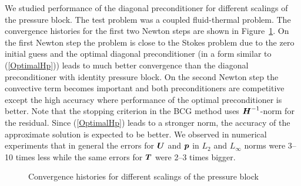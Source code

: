 We studied performance of the diagonal preconditioner for different
scalings of the pressure block. The test problem was a coupled
fluid-thermal problem.   The
convergence histories for the first two Newton steps are shown in
Figure~\ref{fig:precond}. On the first Newton step the problem is close to the Stokes
problem due to the zero initial guess and the optimal diagonal
preconditioner  (in a form similar to (\ref{OptimalHp})) leads to much better convergence than the diagonal
preconditioner with identity pressure block. On the second Newton step the
convective term becomes important and both preconditioners are
competitive except the high accuracy where performance of the optimal
preconditioner is better. Note that the stopping criterion in the BCG
method uses $\mbox{\boldmath $H$}^{-1}$-norm for the residual. Since (\ref{OptimalHp})
leads to a stronger norm, the accuracy of the approximate solution is
expected to be better. We observed in numerical experiments that  
in general the errors for $\mbox{\boldmath $U$}$ and $\mbox{\boldmath $p$}$ in $L_2$ and
$L_\infty$ norms were 3--10 times less while the same errors
for $\mbox{\boldmath $T$}$ were 2--3 times bigger.

%
\begin{figure}[hbt]
  \caption{Convergence histories for different scalings of the pressure block}
  \label{fig:precond}
\end{figure}
%

